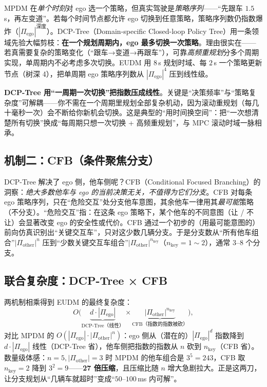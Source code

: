MPDM 在\emph{单个时刻}对 ego 选一个策略，但真实驾驶是\emph{策略序列}——“先跟车 $1.5\,$s，再左变道”。若每个时间节点都允许 ego 切换到任意策略，策略序列数仍指数爆炸（$|\Pi_{\mathrm{ego}}|^{\text{深度}}$）。DCP-Tree（Domain-specific Closed-loop Policy Tree）用一条领域先验大幅剪枝：\textbf{在一个规划周期内，ego 最多切换一次策略}\cite{zhang2020eudm}。理由很实在——若真需要复杂的策略变化（“跟车→变道→再跟车”），可靠\emph{高频重规划}分多个周期实现，单周期内不必考虑多次切换。EUDM 用 $8\,$s 规划时域、每 $2\,$s 一个策略更新节点（树深 4），把单周期 ego 策略序列数从 $|\Pi_{\mathrm{ego}}|^4$ 压到线性级。

\begin{insight}
\textbf{DCP-Tree 用“一周期一次切换”把指数压成线性}。关键是“决策频率”与“策略复杂度”可解耦——你不需在一个周期里规划全部复杂机动，因为滚动重规划（每几十毫秒一次）会不断给你新机会切换。这是典型的“用时间换空间”：把“一次想清楚所有切换”换成“每周期只想一次切换 + 高频重规划”，与 MPC 滚动时域一脉相承。
\end{insight}

\subsection{机制二：CFB（条件聚焦分支）}
\label{sec:pr-eudm-cfb}

DCP-Tree 解决了 ego 侧，他车侧呢？CFB（Conditional Focused Branching）的洞察：\emph{绝大多数他车与 ego 的当前决策无关，不值得为它们分支}\cite{zhang2020eudm}。CFB 对每条 ego 策略序列，只在“危险交互”处分支他车意图，其余他车一律用其\emph{最可能}策略（不分支）。“危险交互”指：在这条 ego 策略下，某个他车的不同意图（让 / 不让）会显著改变 ego 的安全性或代价。CFB 通过一个初步的（用最可能意图的）前向仿真识别出“关键交互车”，只对这少数几辆分支。于是分支数从“所有他车组合”$|\Pi_{\mathrm{other}}|^n$ 压到“少数关键交互车组合”$|\Pi_{\mathrm{other}}|^{n_{\mathrm{key}}}$（$n_{\mathrm{key}}=1\sim2$），通常 $3$--$8$ 个分支。

\subsection{联合复杂度：DCP-Tree × CFB}
\label{sec:pr-eudm-joint}

两机制相乘得到 EUDM 的最终复杂度\cite{zhang2020eudm}：
\begin{equation}
  O\big(\underbrace{d\cdot|\Pi_{\mathrm{ego}}|}_{\text{DCP-Tree（线性）}}\times\underbrace{|\Pi_{\mathrm{other}}|^{n_{\mathrm{key}}}}_{\text{CFB（指数的指数被砍）}}\big),
  \label{eq:pr-eudm-complexity}
\end{equation}
对比 MPDM 的 $O(|\Pi_{\mathrm{ego}}|\cdot|\Pi_{\mathrm{other}}|^n)$：ego 侧从（潜在的）$|\Pi_{\mathrm{ego}}|^d$ 指数降到 $d\cdot|\Pi_{\mathrm{ego}}|$ 线性（DCP-Tree 省），他车侧把指数的指数从 $n$ 砍到 $n_{\mathrm{key}}$（CFB 省）。数量级体感：$n=5,|\Pi_{\mathrm{other}}|=3$ 时 MPDM 的他车组合是 $3^5=243$，CFB 取 $n_{\mathrm{key}}=2$ 降到 $3^2=9$——\textbf{27 倍压缩}，且压缩比随 $n$ 增大急剧拉大。正是这两刀，让分支规划从“几辆车就超时”变成“$50$--$100\,$ms 内可解”。

